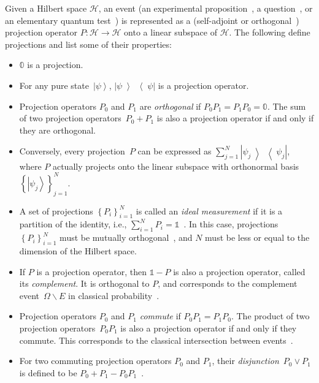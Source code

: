 \documentclass{article}
\theoremstyle{remark}
\newcommand{\Hilb}{\mathcal{H}}
\newcommand{\ket}[1]{{\left\vert{#1}\right\rangle}}
\newcommand{\op}[2]{\ensuremath{\left\vert{#1}\middle\rangle\middle\langle{#2}\right\vert}}
\newcommand{\proj}[1]{\op{#1}{#1}}
\begin{document}
\begin{definition}\label{def:Projection}
Given a Hilbert space $\Hilb$, an event (an experimental proposition~\cite{BirkhoffVonNeumann1936},
a question~\cite{10.2307/2308516,Abramsky2012}, or an elementary
quantum test~\cite{peres1995quantum}) is represented as a (self-adjoint
or orthogonal~\cite{Griffiths2003,Maassen2010}) projection operator
$P:\Hilb\rightarrow\Hilb$ onto a linear subspace of $\Hilb$. The
following define projections and list some of their properties: 
\begin{itemize}
\item $\mathbb{0}$ is a projection. 
\item For any pure state~$\ket{\psi}$, $\proj{\psi}$ is a projection
operator. 
\item Projection operators $P_{0}$ and $P_{1}$ are \emph{orthogonal} if
$P_{0}P_{1}=P_{1}P_{0}=\mathbb{0}$. The sum of two projection operators~$P_{0}+P_{1}$
is also a projection operator if and only if they are orthogonal. 
\item Conversely, every projection~$P$ can be expressed as $\sum_{j=1}^{N}\proj{\psi_{j}}$,
where $P$ actually projects onto the linear subspace with orthonormal
basis~$\left\{ \ket{\psi_{j}}\right\} _{j=1}^{N}$. 
\item A set of projections $\left\{ P_{i}\right\} _{i=1}^{N}$ is called
an \emph{ideal measurement} if it is a partition of the identity,
i.e., $\sum_{i=1}^{N}P_{i}=\mathbb{1}$~\cite{Swart2013}. In this
case, projections $\left\{ P_{i}\right\} _{i=1}^{N}$ must be mutually
orthogonal~\cite{Griffiths2003,Halmos1957}, and $N$ must be less
or equal to the dimension of the Hilbert space. 
\item If $P$ is a projection operator, then $\mathbb{1}-P$ is also a projection
operator, called its \emph{complement}. It is orthogonal to $P$,
and corresponds to the complement event~$\Omega\backslash E$ in
classical probability~\cite{Griffiths2003}. 
\item Projection operators $P_{0}$ and $P_{1}$ \emph{commute} if $P_{0}P_{1}=P_{1}P_{0}$.
The product of two projection operators~$P_{0}P_{1}$ is also a projection
operator if and only if they commute. This corresponds to the classical
intersection between events~\cite{peres1995quantum,Griffiths2003}. 
\item For two commuting projection operators $P_{0}$ and $P_{1}$, their
\emph{disjunction}~$P_{0}\vee P_{1}$ is defined to be $P_{0}+P_{1}-P_{0}P_{1}$~\cite{Griffiths2003}. 
\end{itemize}
\end{definition}
\end{document}
